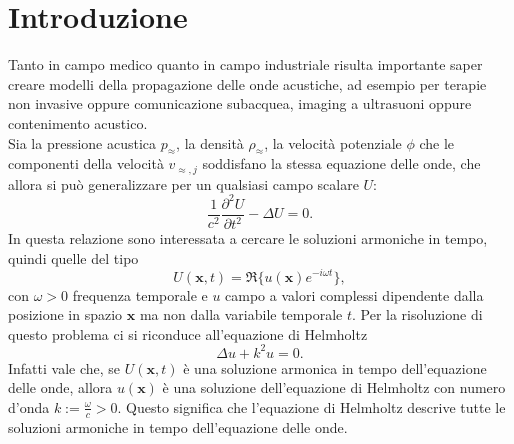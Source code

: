 \documentclass[a4paper]{article}
\theoremstyle{definition}
\theoremstyle{plain}
\theoremstyle{remark}
\begin{document}
	\section*{Introduzione}
	{ 
	Tanto in campo medico quanto in campo industriale risulta importante saper creare modelli della propagazione delle onde acustiche, ad esempio per terapie non invasive oppure comunicazione subacquea, imaging a ultrasuoni oppure contenimento acustico. \\
	Sia la pressione acustica $p_\approx$, la densità $\rho_\approx$, la velocità potenziale $\phi$ che le componenti della velocità $v_{\approx,j}$ soddisfano la stessa equazione delle onde, che allora si può generalizzare per un qualsiasi campo scalare $U$:
	\begin{equation*}
		\frac{1}{c^2} \frac{\partial^2 U}{\partial t^2} - \Delta U = 0.
	\end{equation*}
	In questa relazione sono interessata a cercare le soluzioni armoniche in tempo, quindi quelle del tipo
	\begin{equation*}
		U(\textbf{x},t) = \Re \{ u(\textbf{x}) e^{-i \omega t} \},
	\end{equation*}
	con $\omega>0$ frequenza temporale e $u$ campo a valori complessi dipendente dalla posizione in spazio $\textbf{x}$ ma non dalla variabile temporale $t$. 
	Per la risoluzione di questo problema ci si riconduce all'equazione di Helmholtz
	\begin{equation*}
		\Delta u + k^2 u = 0.
	\end{equation*}
	Infatti vale che, se $U(\textbf{x},t)$ è una soluzione armonica in tempo dell'equazione delle onde, allora $u(\textbf{x})$ è una soluzione dell'equazione di Helmholtz con numero d'onda $k:=\frac{\omega}{c}>0$. Questo significa che l'equazione di Helmholtz descrive tutte le soluzioni armoniche in tempo dell'equazione delle onde.\\
	
}
\end{document}
